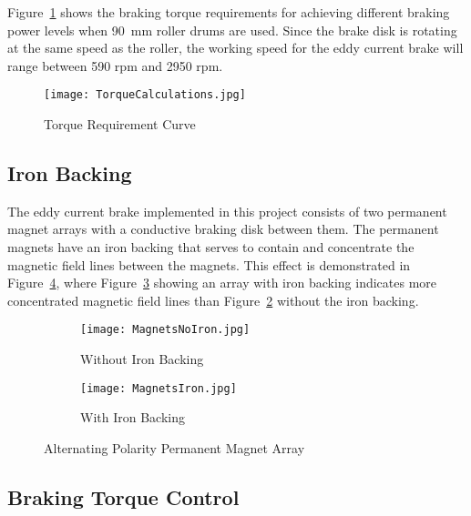 Figure~\ref{fig:torqueCalc} shows the braking torque requirements for achieving different braking power levels when \SI{90}{\milli\meter} roller drums are used. Since the brake disk is rotating at the same speed as the roller, the working speed for the eddy current brake will range between 590 \ac{rpm} and 2950 \ac{rpm}.

\begin{figure}[H]
	\begin{center}
		\texttt{[image: TorqueCalculations.jpg]}
		\caption{Torque Requirement Curve}
		\label{fig:torqueCalc}
	\end{center}
\end{figure}

\subsection{Iron Backing}

The eddy current brake implemented in this project consists of two permanent magnet arrays with a conductive braking disk between them. The permanent magnets have an iron backing that serves to contain and concentrate the magnetic field lines between the magnets. This effect is demonstrated in Figure~\ref{fig:magconf}, where Figure~\ref{fig:magiron} showing an array with iron backing indicates more concentrated magnetic field lines than Figure~\ref{fig:magnoiron} without the iron backing. 

\begin{figure}[H]
	\centering
	\begin{subfigure}{.5\textwidth}
		\centering
		\texttt{[image: MagnetsNoIron.jpg]}
		\caption{Without Iron Backing}
		\label{fig:magnoiron}
	\end{subfigure}%
	\begin{subfigure}{.5\textwidth}
		\centering
		\texttt{[image: MagnetsIron.jpg]}
		\caption{With Iron Backing}
		\label{fig:magiron}
	\end{subfigure}
	\caption{Alternating Polarity Permanent Magnet Array}
	\label{fig:magconf}
	\citep{Parsons:2018}
\end{figure}

\vspace*{-0.5cm}

\subsection{Braking Torque Control}

